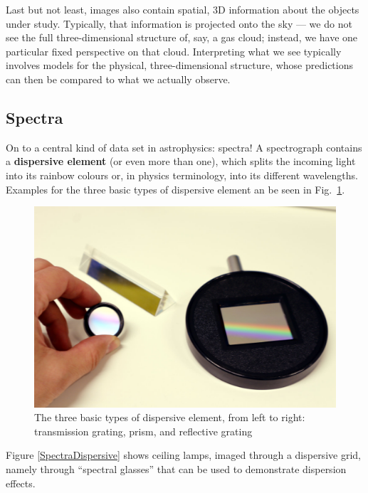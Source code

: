 \documentclass[twocolumn,apj]{openjournal}
\begin{document}
Last but not least, images also contain spatial, 3D information about the objects under study. Typically, that information is projected onto the sky --- we do not see the full three-dimensional structure of, say, a gas cloud; instead, we have one particular fixed perspective on that cloud. Interpreting what we see typically involves models for the physical, three-dimensional structure, whose predictions can then be compared to what we actually observe.

\subsection{Spectra}
\label{Spectra}

On to a central kind of data set in astrophysics: spectra! A spectrograph contains a {\bf dispersive element} (or even more than one), which splits the incoming light into its rainbow colours or, in physics terminology, into its different wavelengths. Examples for the three basic types of dispersive element an be seen in Fig.~\ref{DispersiveExample}.
\begin{figure}[htbp]
\begin{center}
\includegraphics[width=\linewidth]{./fIMG_2378.JPG}
\caption{The three basic types of dispersive element, from left to right: transmission grating, prism, and reflective grating}
\label{DispersiveExample}
\end{center}
\end{figure}
Figure \ref{SpectraDispersive} shows ceiling lamps, imaged through a dispersive grid, namely through ``spectral glasses'' that can be used to demonstrate dispersion effects.
\end{document}
